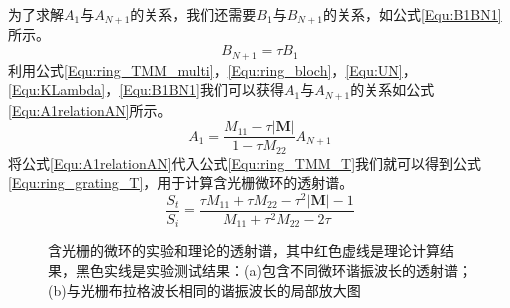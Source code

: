 为了求解$A_1$与$A_{N+1}$的关系，我们还需要$B_{1}$与$B_{N+1}$的关系，如公式\ref{Equ:B1BN1}所示。
\begin{equation}
\label{Equ:B1BN1}
B_{N+1} = \tau B_1 
\end{equation}
利用公式\ref{Equ:ring_TMM_multi}，\ref{Equ:ring_bloch}，\ref{Equ:UN}，\ref{Equ:KLambda}，\ref{Equ:B1BN1}我们可以获得$A_1$与$A_{N+1}$的关系如公式\ref{Equ:A1relationAN}所示。
\begin{equation}
\label{Equ:A1relationAN}
A_1 = \frac{M_{11}-\tau |\textbf{M}|}{1-\tau M_{22}}A_{N+1}
\end{equation}
将公式\ref{Equ:A1relationAN}代入公式\ref{Equ:ring_TMM_T}我们就可以得到公式\ref{Equ:ring_grating_T}，用于计算含光栅微环的透射谱。
\begin{equation}
\label{Equ:ring_grating_T}
\frac{S_t}{S_i}=\frac{\tau M_{11} + \tau M_{22} - \tau^2|\textbf{M}|-1}{M_{11}+\tau^2 M_{22}-2\tau}
\end{equation}
\begin{figure}[htb]
	\small
	\caption{含光栅的微环的实验和理论的透射谱，其中红色虚线是理论计算结果，黑色实线是实验测试结果：(a)包含不同微环谐振波长的透射谱；(b)与光栅布拉格波长相同的谐振波长的局部放大图}
	\label{chapt5_grating_ring_single}	
\end{figure}

